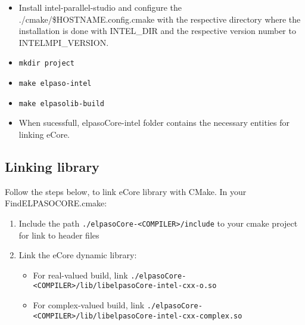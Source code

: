 \begin{enumerate}
\begin{enumerate}
        \begin{itemize}
            \item Install intel-parallel-studio and configure the ./cmake/\$HOSTNAME.config.cmake with the respective directory where the installation is done with INTEL\_DIR and the respective version number to INTELMPI\_VERSION.
            \item \texttt{mkdir project}
            \item \texttt{make elpaso-intel}
            \item \texttt{make elpasolib-build}
            \item When sucessfull, elpasoCore-intel folder contains the necessary entities for linking eCore.
        \end{itemize}
    \end{enumerate}
\end{enumerate}

\subsection{Linking library}
Follow the steps below, to link eCore library with CMake. In your FindELPASOCORE.cmake:
\begin{enumerate}
    \item Include the path \texttt{./elpasoCore-<COMPILER>/include} to your cmake project for link to header files
    \item Link the eCore dynamic library:
    \begin{itemize}
        \item For real-valued build, link \texttt{./elpasoCore-<COMPILER>/lib/libelpasoCore-intel-cxx-o.so}
        \item For complex-valued build, link \texttt{./elpasoCore-<COMPILER>/lib/libelpasoCore-intel-cxx-complex.so}
    \end{itemize}
\end{enumerate}
